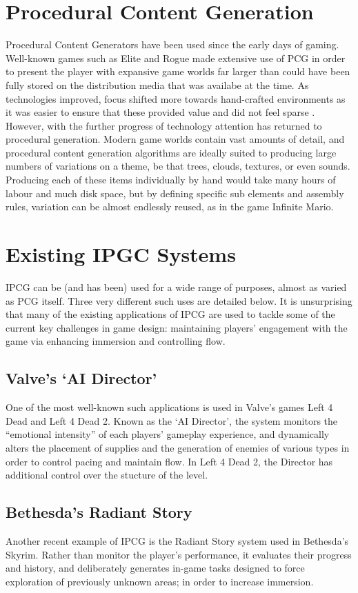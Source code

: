 \documentclass[a4paper,oneside,12pt,openany]{memoir}
\begin{document}
\section{Procedural Content Generation}
Procedural Content Generators have been used since the early days of gaming. Well-known games such as Elite and Rogue made extensive use of PCG in order to present the player with expansive game worlds far larger than could have been fully stored on the distribution media that was availabe at the time. As technologies improved, focus shifted more towards hand-crafted environments as it was easier to ensure that these provided value and did not feel sparse \cite{charbitat}. However, with the further progress of technology attention has returned to procedural generation. Modern game worlds contain vast amounts of detail, and procedural content generation algorithms are ideally suited to producing large numbers of variations on a theme, be that trees, clouds, textures, or even sounds. Producing each of these items individually by hand would take many hours of labour and much disk space, but by defining specific sub elements and assembly rules, variation can be almost endlessly reused, as in the game Infinite Mario.%

\section{Existing IPGC Systems}
IPCG can be (and has been) used for a wide range of purposes, almost as varied as PCG itself. Three very different such uses are detailed below. It is unsurprising that many of the existing applications of IPCG are used to tackle some of the current key challenges in game design: maintaining players' engagement with the game via enhancing immersion and controlling flow\cite{flow}. 
\subsection{Valve's `AI Director'}
One of the most well-known such applications is used in Valve's games Left 4 Dead and Left 4 Dead 2. Known as the `AI Director', the system monitors the ``emotional intensity'' of each players' gameplay experience, and dynamically alters the placement of supplies and the generation of enemies of various types in order to control pacing and maintain flow. In Left 4 Dead 2, the Director has additional control over the stucture of the level\cite{valve}.
\newpage
\vspace*{1.4cm}
\subsection{Bethesda's Radiant Story}
Another recent example of IPCG is the Radiant Story system used in Bethesda's Skyrim. Rather than monitor the player's performance, it evaluates their progress and history, and deliberately generates in-game tasks designed to force exploration of previously unknown areas; in order to increase immersion.%
\end{document}
